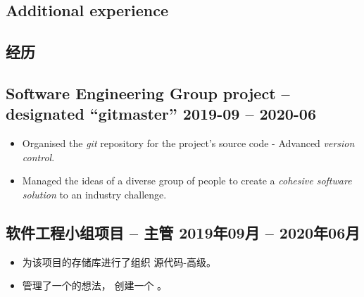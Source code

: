 \documentclass[cv.tex]{subfiles}
\begin{document}
\begin{xen}
\section{Additional experience}
\end{xen}
\begin{xcn}
\section{经历}
\end{xcn}
\begin{xen}
    \subsection{Software Engineering Group project -- designated ``gitmaster''
    \hfill 2019-09 -- 2020-06}
        \begin{itemize}
            \item Organised the \emph{git} repository for the project's source
                code - Advanced \emph{version control}.
            \item Managed the ideas of a diverse group of people to create a
                \emph{cohesive software solution} to an industry challenge.
        \end{itemize}
\end{xen}
\begin{xcn}
    \subsection{软件工程小组项目 -- 主管
    \hfill 2019年09月 -- 2020年06月}
        \begin{itemize}
            \item 为该项目的存储库进行了组织
                源代码-高级。
            \item 管理了一个的想法，
                创建一个 。
        \end{itemize}
\end{xcn}
\end{document}
